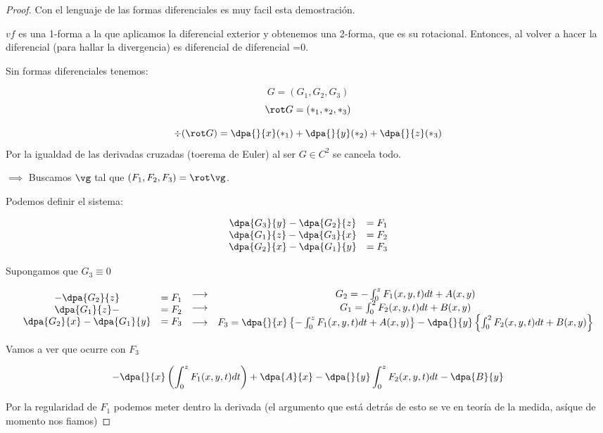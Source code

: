 \begin{proof}

Con el lenguaje de las formas diferenciales es muy facil esta demostración.

$vf$ es una 1-forma a la que aplicamos la diferencial exterior y obtenemos una 2-forma, que es su rotacional. Entonces, al volver a hacer la diferencial (para hallar la divergencia) es diferencial de diferencial =0.


Sin formas diferenciales tenemos:

\[G=(G_1,G_2,G_3)\]
\[\rot G = \left(\ast_1,\ast_2,\ast_3\right)\]

\[\div(\rot G) = \dpa{}{x}(\ast_1) + \dpa{}{y}(\ast_2) + \dpa{}{z}(\ast_3)\]
Por la igualdad de las derivadas cruzadas (toerema de Euler) al ser $G\in C^2$ se cancela todo.

$\implies$ Buscamos $\vg$ tal que $(F_1,F_2,F_3) = \rot \vg$.

Podemos definir el sistema:

\[\begin{array}{cc}
\dpa{G_3}{y} - \dpa{G_2}{z} &= F_1\\
\dpa{G_1}{z} - \dpa{G_3}{x} &= F_2\\
\dpa{G_2}{x} - \dpa{G_1}{y} &= F_3
\end{array}\]

Supongamos que $G_3\equiv 0$

\[\begin{array}{cc}
 - \dpa{G_2}{z} &= F_1\\
\dpa{G_1}{z} - &= F_2\\
\dpa{G_2}{x} - \dpa{G_1}{y} &= F_3
\end{array} \begin{array}{cc}
\longrightarrow & G_2 = -\int_0^z F_1(x,y,t)dt+A(x,y)\\
\longrightarrow & G_1 = \int_0^2 F_2(x,y,t)dt + B(x,y)\\
\longrightarrow & F_3 = \dpa{}{x} \left\{-\int_0^z F_1(x,y,t)dt + A(x,y)\right\}
- \dpa{}{y}\left\{\int_0^2 F_2(x,y,t)dt + B(x,y) \right\}
\end{array}
\]

Vamos a ver que ocurre con  $F_3$

\[-\dpa{}{x}\left(\int_0^z F_1(x,y,t)dt\right) + \dpa{A}{x} - \dpa{}{y}\int_0^z F_2(x,y,t)dt - \dpa{B}{y}\]

Por la regularidad de $F_1$ podemos meter dentro la derivada (el argumento que está detrás de esto se ve en teoría de la medida, asíque de momento nos fiamos)


\end{proof}
